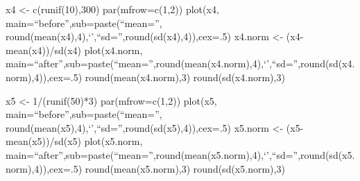 \documentclass[]{article}
\begin{document}
x4 \textless{}- c(runif(10),300) par(mfrow=c(1,2)) plot(x4,
main=``before'',sub=paste(``mean='',
round(mean(x4),4),`\textbar{}',``sd='',round(sd(x4),4)),cex=.5) x4.norm
\textless{}- (x4-mean(x4))/sd(x4) plot(x4.norm,
main=``after'',sub=paste(``mean='',round(mean(x4.norm),4),`\textbar{}',``sd='',round(sd(x4.norm),4)),cex=.5)
round(mean(x4.norm),3) round(sd(x4.norm),3)

x5 \textless{}- 1/(runif(50)*3) par(mfrow=c(1,2)) plot(x5,
main=``before'',sub=paste(``mean='',
round(mean(x5),4),`\textbar{}',``sd='',round(sd(x5),4)),cex=.5) x5.norm
\textless{}- (x5-mean(x5))/sd(x5) plot(x5.norm,
main=``after'',sub=paste(``mean='',round(mean(x5.norm),4),`\textbar{}',``sd='',round(sd(x5.norm),4)),cex=.5)
round(mean(x5.norm),3) round(sd(x5.norm),3)
\end{document}

